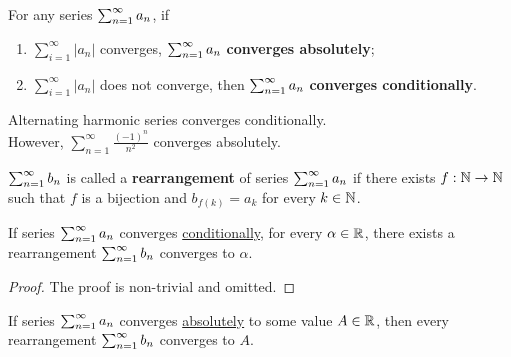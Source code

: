 \documentclass[11pt]{article}
\begin{document}
	\begin{definition}
		For any series $\sum_{{n}=1}^\infty {a}_{n}$, if 
		\begin{enumerate}
			\item $\sum_{i=1}^\infty |a_n|$ converges, $\sum_{{n}=1}^\infty {a}_{n}$ \textbf{converges absolutely};
			\item $\sum_{i=1}^\infty |a_n|$ does not converge, then $\sum_{{n}=1}^\infty {a}_{n}$ \textbf{converges conditionally}.
		\end{enumerate}
	\end{definition}
	
	\begin{example}
		Alternating harmonic series converges conditionally. \\However, $\sum_{n=1}^\infty \frac{(-1)^n}{n^2}$ converges absolutely.
	\end{example}
	
	\begin{definition}
		$\sum_{{n}=1}^\infty {b}_{n}$ is called a \textbf{rearrangement} of series $\sum_{{n}=1}^\infty {a}_{n}$ if there exists $f: \mathbb{N} \to \mathbb{N}$ such that $f$ is a bijection and $b_{f(k)} = a_k$ for every $k \in \mathbb{N}$.
	\end{definition}
	
	\begin{theorem}
		If series $\sum_{{n}=1}^\infty {a}_{n}$ converges \ul{conditionally}, for every $\alpha \in \mathbb{R}$, there exists a rearrangement $\sum_{{n}=1}^\infty {b}_{n}$ converges to $\alpha$.
	\end{theorem}
	
	\begin{proof}
		The proof is non-trivial and omitted.
	\end{proof}
	
	\begin{theorem}
		If series $\sum_{{n}=1}^\infty {a}_{n}$ converges \ul{absolutely} to some value $A \in \mathbb{R}$, then every rearrangement $\sum_{{n}=1}^\infty {b}_{n}$ converges to $A$.
	\end{theorem}
	
\end{document}
